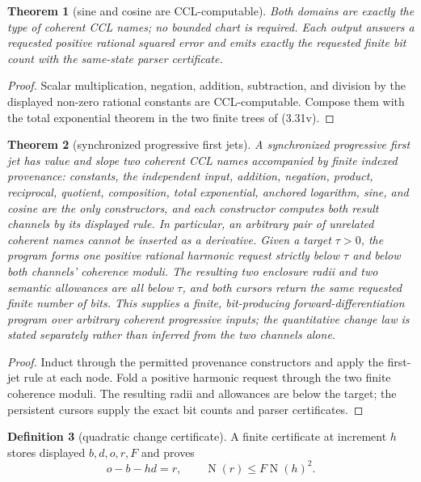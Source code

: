 \documentclass[10pt]{article}
\newtheorem{theorem}{Theorem}[section]
\theoremstyle{definition}
\newtheorem{definition}[theorem]{Definition}
\theoremstyle{remark}
\newcommand{\Norm}{\operatorname{N}}
\begin{document}
\begin{theorem}[sine and cosine are CCL-computable]
Both domains are exactly the type of coherent CCL names; no bounded chart is
required.  Each output answers a requested positive rational squared error
and emits exactly the requested finite bit count with the same-state parser
certificate.
\end{theorem}

\begin{proof}
Scalar multiplication, negation, addition, subtraction, and division by the
displayed non-zero rational constants are CCL-computable.  Compose them with
the total exponential theorem in the two finite trees of (3.31v).
\end{proof}

\begin{theorem}[synchronized progressive first jets]
A synchronized progressive first jet has value and slope
two coherent CCL names accompanied by finite indexed provenance: constants,
the independent input, addition, negation, product, reciprocal, quotient,
composition, total exponential, anchored logarithm, sine, and cosine are the
only constructors, and each constructor computes both result channels by its
displayed rule.  In particular, an arbitrary pair of unrelated coherent names
cannot be inserted as a derivative.  Given a target $\tau>0$, the program
forms one positive rational harmonic request strictly below $\tau$ and below
both channels' coherence moduli.  The resulting two enclosure radii and two
semantic allowances are all below $\tau$, and both cursors return the same
requested finite number of bits.  This supplies a finite, bit-producing
forward-differentiation program over arbitrary coherent progressive inputs;
the quantitative change law is stated separately rather than inferred from
the two channels alone.
\end{theorem}

\begin{proof}
Induct through the permitted provenance constructors and apply the first-jet
rule at each node.  Fold a positive harmonic request through the two finite
coherence moduli.  The resulting radii and allowances are below the target;
the persistent cursors supply the exact bit counts and parser certificates.
\end{proof}

\begin{definition}[quadratic change certificate]
A finite certificate at increment $h$ stores displayed
$b,d,o,r,F$ and proves
\[
 o-b-hd=r,\qquad \Norm(r)\le F\Norm(h)^2.
 \tag{3.31w}
\]
\end{definition}
\end{document}
